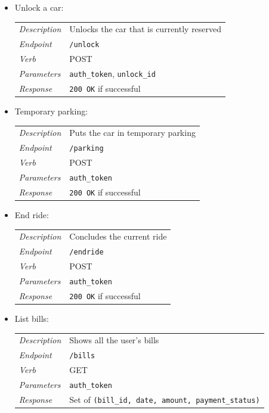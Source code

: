 \documentclass[english]{article}
\newcommand{\code}[1]{\texttt{#1}}
\begin{document}
\begin{itemize}
	\item{Unlock a car:}\\
	\begin{tabular}{ | l l }
		\textit{Description} & Unlocks the car that is currently reserved\\
		\textit{Endpoint} & \code{/unlock} \\ 
		\textit{Verb} & POST \\  
		\textit{Parameters} & \code{auth\_token}, \code{unlock\_id}  \\
		\textit{Response} & \code{200 OK} if successful
	\end{tabular}
	
	\item{Temporary parking:}\\
	\begin{tabular}{ | l l }
		\textit{Description} & Puts the car in temporary parking\\
		\textit{Endpoint} & \code{/parking} \\ 
		\textit{Verb} & POST \\  
		\textit{Parameters} & \code{auth\_token}  \\
		\textit{Response} & \code{200 OK} if successful
	\end{tabular}
	
	\item{End ride:}\\
	\begin{tabular}{ | l l }
		\textit{Description} & Concludes the current ride\\
		\textit{Endpoint} & \code{/endride} \\ 
		\textit{Verb} & POST \\  
		\textit{Parameters} & \code{auth\_token}  \\
		\textit{Response} & \code{200 OK} if successful
	\end{tabular}
	
	\item{List bills:}\\
	\begin{tabular}{ | l l }
		\textit{Description} & Shows all the user's bills\\
		\textit{Endpoint} & \code{/bills} \\ 
		\textit{Verb} & GET \\  
		\textit{Parameters} & \code{auth\_token}  \\
		\textit{Response} & Set of \code{(bill\_id, date, amount, payment\_status)}
	\end{tabular}
	

\end{itemize}
\end{document}
